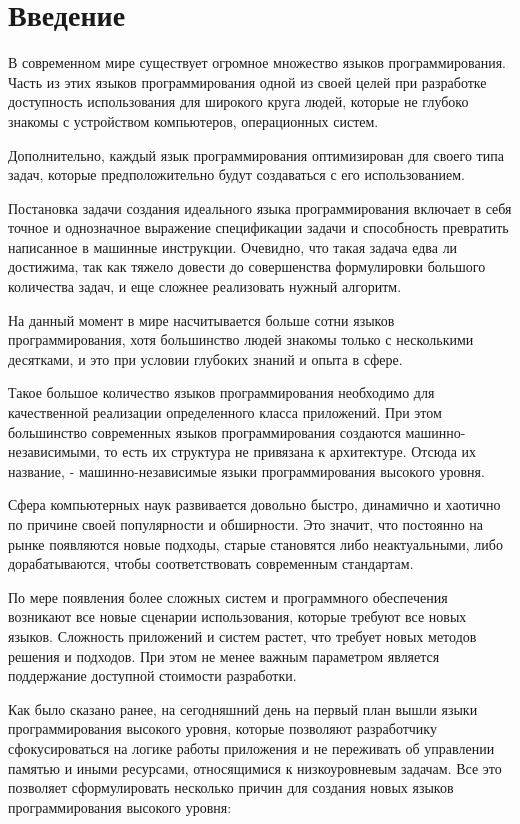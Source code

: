 \documentclass{mipt-thesis-bs}
\begin{document}
\mainmatter


\chapter{Введение}

В современном мире существует огромное множество языков программирования.
Часть из этих языков программирования одной из своей целей при разработке
доступность использования для широкого круга людей, которые не глубоко
знакомы с устройством компьютеров, операционных систем.

Дополнительно, каждый язык программирования оптимизирован для своего типа
задач, которые предположительно будут создаваться с его использованием.

Постановка задачи создания идеального языка программирования включает в себя
точное и однозначное выражение спецификации задачи и способность превратить
написанное в машинные инструкции. Очевидно, что такая задача едва ли достижима,
так как тяжело довести до совершенства формулировки большого количества задач,
и еще сложнее реализовать нужный алгоритм.

На данный момент в мире насчитывается больше сотни языков программирования,
хотя большинство людей знакомы только с несколькими десятками, и это
при условии глубоких знаний и опыта в сфере.

Такое большое количество языков программирования необходимо для качественной
реализации определенного класса приложений. При этом большинство современных
языков программирования создаются машинно-независимыми, то есть их структура
не привязана к архитектуре. Отсюда их название, - машинно-независимые языки
программирования высокого уровня.

Сфера компьютерных наук развивается довольно быстро, динамично и хаотично
по причине своей популярности и обширности. Это значит, что постоянно
на рынке появляются новые подходы, старые становятся либо неактуальными, либо
дорабатываются, чтобы соответствовать современным стандартам.

По мере появления более сложных систем и программного обеспечения возникают
все новые сценарии использования, которые требуют все новых языков. Сложность
приложений и систем растет, что требует новых методов решения и подходов. При
этом не менее важным параметром является поддержание доступной стоимости
разработки.

Как было сказано ранее, на сегодняшний день на первый план вышли языки
программирования высокого уровня, которые позволяют разработчику
сфокусироваться на логике работы приложения и не переживать об
управлении памятью и иными ресурсами, относящимися к низкоуровневым
задачам. Все это позволяет сформулировать несколько причин для создания
новых языков программирования высокого уровня:
\end{document}
